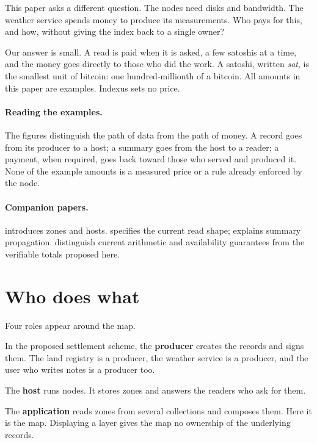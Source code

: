\documentclass[11pt]{article}
\begin{document}
This paper asks a different question. The nodes need disks and bandwidth. The weather service spends money to produce its measurements. Who pays for this, and how, without giving the index back to a single owner?

Our answer is small. A read is paid when it is asked, a few satoshis at a time, and the money goes directly to those who did the work. A satoshi, written \emph{sat}, is the smallest unit of bitcoin: one hundred-millionth of a bitcoin. All amounts in this paper are examples. Indexus sets no price.

\paragraph{Reading the examples.}
The figures distinguish the path of data from the path of money. A record goes from its producer to a host; a summary goes from the host to a reader; a payment, when required, goes back toward those who served and produced it. None of the example amounts is a measured price or a rule already enforced by the node.

\paragraph{Companion papers.}
 introduces zones and hosts.
 specifies the current read shape;
 explains summary propagation.
 distinguish current
arithmetic and availability guarantees from the verifiable totals proposed here.

\section{Who does what}

Four roles appear around the map.

In the proposed settlement scheme, the \textbf{producer} creates the records and signs them. The land registry is a producer, the weather service is a producer, and the user who writes notes is a producer too.

The \textbf{host} runs nodes. It stores zones and answers the readers who ask for them.

The \textbf{application} reads zones from several collections and composes them. Here it is the map. Displaying a layer gives the map no ownership of the underlying records.
\end{document}
